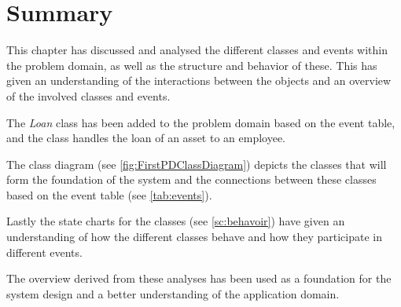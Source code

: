 \section{Summary} \label{ssc:pd_summary}
This chapter has discussed and analysed the different classes and events within the problem domain, as well as the structure and behavior of these. This has given an understanding of the interactions between the objects and an overview of the involved classes and events. 
\par 
The \textit{Loan} class has been added to the problem domain based on the event table, and the class handles the loan of an asset to an employee. 
\par
The class diagram (see \autoref{fig:FirstPDClassDiagram}) depicts the classes that will form the foundation of the system and the connections between these classes based on the event table (see \autoref{tab:events}).  
\par
Lastly the state charts for the classes (see \autoref{sc:behavoir}) have given an understanding of how the different classes behave and how they participate in different events.
\par
The overview derived from these analyses has been used as a foundation for the system design and a better understanding of the application domain.
